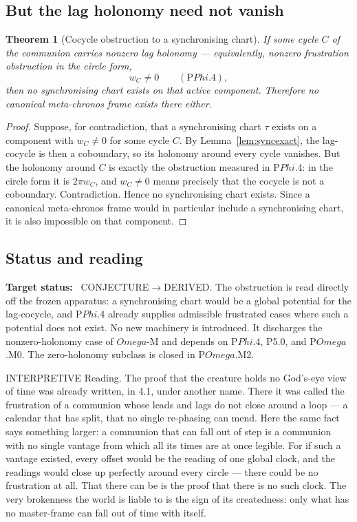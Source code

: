 \documentclass[11pt,a4paper]{article}
\def\Omega{Omega}%
\def\Phi{Phi}%
\def\emph#1{#1}%
\newcommand{\stDerived}{\textcolor{cDer}{\textsf{\small DERIVED}}}
\newcommand{\stInterp}{\textcolor{cInt}{\textsf{\small INTERPRETIVE}}}
\newcommand{\stConj}{\textcolor{cCon}{\textsf{\small CONJECTURE}}}
\theoremstyle{definition}
\theoremstyle{plain}
\newtheorem{theorem}[definition]{Theorem}
\theoremstyle{remark}
\begin{document}
\subsection{But the lag holonomy need not vanish}

\begin{theorem}[Cocycle obstruction to a synchronising chart]\label{thm:cocycleobstruction}
If some cycle \(C\) of the communion carries nonzero lag holonomy --- equivalently,
nonzero frustration obstruction in the circle form,
\[
w_C\neq0
\qquad
(\text{P}\Phi.4),
\]
then no synchronising chart exists on that active component. Therefore no canonical
meta-chronos frame exists there either.
\end{theorem}

\begin{proof}
Suppose, for contradiction, that a synchronising chart \(\tau\) exists on a
component with \(w_C\neq0\) for some cycle \(C\). By
Lemma~\ref{lem:syncexact}, the lag-cocycle is then a coboundary, so its holonomy
around every cycle vanishes. But the holonomy around \(C\) is exactly the
obstruction measured in P\(\Phi\).4: in the circle form it is \(2\pi w_C\), and
\(w_C\neq0\) means precisely that the cocycle is not a coboundary. Contradiction.
Hence no synchronising chart exists. Since a canonical meta-chronos frame would in
particular include a synchronising chart, it is also impossible on that component.
\qedhere
\end{proof}

\subsection{Status and reading}

\textbf{Target status:}~
\stConj\(\to\)\stDerived. The obstruction is read directly off the frozen
apparatus: a synchronising chart would be a global potential for the lag-cocycle,
and P\(\Phi\).4 already supplies admissible frustrated cases where such a potential
does not exist. No new machinery is introduced. It discharges the nonzero-holonomy
case of \(\Omega\)-M and depends on P\(\Phi\).4, P5.0, and P\(\Omega\).M0. The
zero-holonomy subclass is closed in P\(\Omega\).M2.

\medskip
\stInterp\quad
\emph{Reading.}
The proof that the creature holds no God's-eye view of time was already written, in 4.1,
under another name. There it was called the frustration of a communion whose leads and lags do
not close around a loop --- a calendar that has split, that no single re-phasing can mend. Here
the same fact says something larger: a communion that \emph{can} fall out of step is a
communion with no single vantage from which all its times are at once legible. For if such a
vantage existed, every offset would be the reading of one global clock, and the readings would
close up perfectly around every circle --- there could be no frustration at all. That there can
be is the proof that there is no such clock. The very brokenness the world is liable to is the
sign of its createdness: only what has no master-frame can fall out of time with itself.
\end{document}
